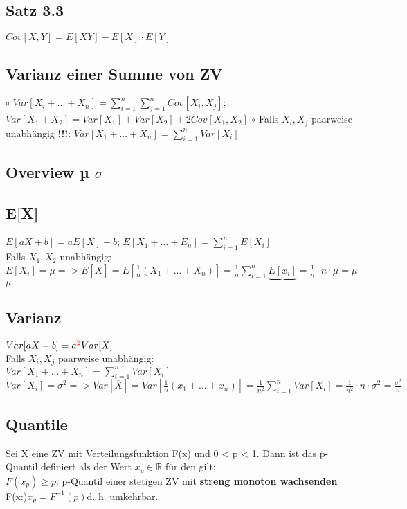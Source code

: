 \subsection{Satz 3.3}
$Cov[X, Y] = E[XY] - E[X] \cdot E[Y]$\\
\subsection{Varianz einer Summe von ZV}
  $\circ$ $Var[X_{i} + ... + X_{n}] = \sum_{i=1}^{n} \sum_{j=1}^{n} Cov[X_{i}, X_{j}]$; 
  $Var[X_{1} + X_{2}] = Var[X_{1}] + Var[X_{2}] + 2Cov[X_{1}, X_{2}]$
  $\circ$ Falls $X_{i} , X_{j}$ paarweise unabhängig \textbf{!!!}: $Var[X_{1} + ...+ X_{n}] = \sum_{i=1}^{n} Var[X_{i}]$
\subsection{Overview µ $\sigma$}
\subsection{E[X]}
$ E[aX + b] = aE[X]+b $; 
$ E[X_{1}+ ...+ E_{n}] = \sum_{i=1}^{n} E[X_{i}]$\\
Falls $X_{1}, X_{2}$ unabhängig:\\
$E[X_{i}] = \mu => E[\overline{X}] = E[\frac{1}{n}(X_{1} + ...+ X_{n})] =  \frac{1}{n}\sum_{i=1}^{n} \underbrace{E[x_{i}]} = \frac{1}{n}\cdot n \cdot \mu = \mu$\\
$\mu$\\
\subsection{Varianz}
$Var[aX + b] = a\textcolor{red}{^2}Var[X]$\\
Falls $X_{i}, X_{j}$ paarweise unabhängig:\\
$Var[X_{1} + ... + X_{n}] = \sum_{i=1}^{n} Var[X_{i}]$\\
$Var[X_{i}] = \sigma^2 => Var[\overline{X}] = Var[\frac{1}{n}(x_{1} + ... + x_{n})] = \frac{1}{n^2} \sum_{i=1}^{n} Var[X_{i}] = \frac{1}{n^2} \cdot n \cdot \sigma^2 = \frac{\sigma^2}{n}$
\subsection{Quantile}
Sei X eine ZV mit Verteilungsfunktion F(x) und 0 < p < 1. Dann ist das p-Quantil definiert als der Wert $x_{p} \in \mathbb{R}$ für den gilt:\\
$F(x_{p}) \ge p.$ p-Quantil einer stetigen ZV mit \textbf{streng monoton wachsenden} F(x:)$x_{p} = F^{-1}(p)$d. h. umkehrbar.